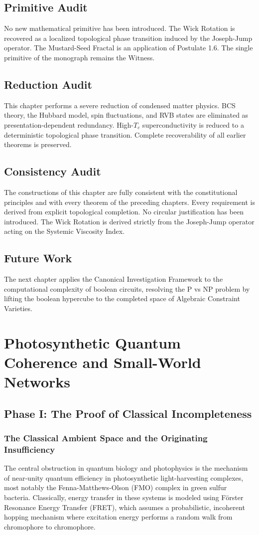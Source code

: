 \documentclass[11pt,openany]{extbook}
\newenvironment{primitiveaudit}{\section*{Primitive Audit}}{}
\newenvironment{reductionaudit}{\section*{Reduction Audit}}{}
\newenvironment{consistencyaudit}{\section*{Consistency Audit}}{}
\newenvironment{futurework}{\section*{Future Work}}{}
\theoremstyle{plain}
\theoremstyle{definition}
\begin{document}
\begin{primitiveaudit}
\noindent No new mathematical primitive has been introduced. The Wick Rotation is recovered as a localized topological phase transition induced by the Joseph-Jump operator. The Mustard-Seed Fractal is an application of Postulate 1.6. The single primitive of the monograph remains the Witness.
\end{primitiveaudit}

\begin{reductionaudit}
\noindent This chapter performs a severe reduction of condensed matter physics. BCS theory, the Hubbard model, spin fluctuations, and RVB states are eliminated as presentation-dependent redundancy. High-$T_c$ superconductivity is reduced to a deterministic topological phase transition. Complete recoverability of all earlier theorems is preserved.
\end{reductionaudit}

\begin{consistencyaudit}
\noindent The constructions of this chapter are fully consistent with the constitutional principles and with every theorem of the preceding chapters. Every requirement is derived from explicit topological completion. No circular justification has been introduced. The Wick Rotation is derived strictly from the Joseph-Jump operator acting on the Systemic Viscosity Index.
\end{consistencyaudit}

\begin{futurework}
\noindent The next chapter applies the Canonical Investigation Framework to the computational complexity of boolean circuits, resolving the P vs NP problem by lifting the boolean hypercube to the completed space of Algebraic Constraint Varieties.
\end{futurework}

\chapter{Photosynthetic Quantum Coherence and Small-World Networks}

\section{Phase I: The Proof of Classical Incompleteness}

\subsection{The Classical Ambient Space and the Originating Insufficiency}
The central obstruction in quantum biology and photophysics is the mechanism of near-unity quantum efficiency in photosynthetic light-harvesting complexes, most notably the Fenna-Matthews-Olson (FMO) complex in green sulfur bacteria. Classically, energy transfer in these systems is modeled using F\"orster Resonance Energy Transfer (FRET), which assumes a probabilistic, incoherent hopping mechanism where excitation energy performs a random walk from chromophore to chromophore.
\end{document}

